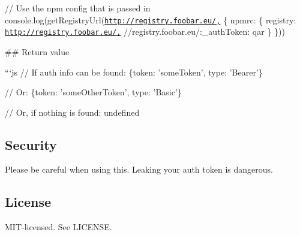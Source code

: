 // Use the npm config that is passed in console.\+log(get\+Registry\+Url(\textquotesingle{}\href{http://registry.foobar.eu/',}{\tt http\+://registry.\+foobar.\+eu/\textquotesingle{},} \{ npmrc\+: \{ \textquotesingle{}registry\textquotesingle{}\+: \textquotesingle{}\href{http://registry.foobar.eu/',}{\tt http\+://registry.\+foobar.\+eu/\textquotesingle{},} \textquotesingle{}//registry.foobar.\+eu/\+:\+\_\+auth\+Token\textquotesingle{}\+: \textquotesingle{}qar\textquotesingle{} \} \})) 
\begin{DoxyCode}
## Return value

```js
// If auth info can be found:
\{token: 'someToken', type: 'Bearer'\}

// Or:
\{token: 'someOtherToken', type: 'Basic'\}

// Or, if nothing is found:
undefined
\end{DoxyCode}


\subsection*{Security}

Please be careful when using this. Leaking your auth token is dangerous.

\subsection*{License}

M\+I\+T-\/licensed. See L\+I\+C\+E\+N\+SE. 